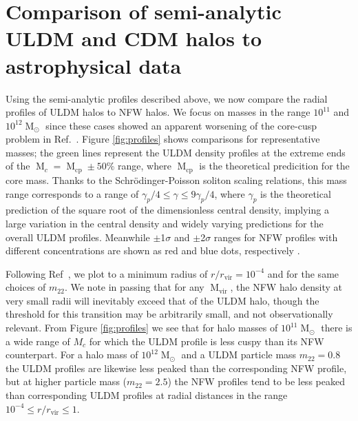 \documentclass[a4paper,11pt]{article}
\begin{document}
\section{Comparison of semi-analytic ULDM and CDM halos to astrophysical data}\label{sec:velocity}

 
Using the semi-analytic profiles described above, we now compare the radial profiles of ULDM halos to NFW halos. We focus on masses in the range $10^{11}$ and $10^{12} \operatorname{M}_{\odot}$ since these cases showed an apparent worsening of the core-cusp problem in Ref.~\cite{Robles:2018fur}. Figure \ref{fig:profiles} shows comparisons for representative masses; the green lines represent the ULDM density profiles at the extreme ends of the $\operatorname{M}_c = \operatorname{M}_{\mathrm{cp}} \pm 50 \% $ range, where $\operatorname{M}_{\mathrm{cp}}$ is the theoretical predicition for the core mass. Thanks to the  Schr{\"o}dinger-Poisson soliton scaling relations, this mass range corresponds to a range of $ \gamma_p /4 \leq \gamma \leq 9\gamma_p/4$, where $\gamma_p$ is the theoretical prediction of the square root of the dimensionless central density, implying a large variation in the central density and widely varying predictions for the overall ULDM profiles. Meanwhile $\pm$1$\sigma$ and $\pm$2$\sigma$ ranges for NFW profiles with different concentrations are shown as red and blue dots, respectively \cite{Maccio:2008pcd}. 

Following Ref~\cite{Robles:2018fur}, we plot to a minimum radius of $r/r_{\mathrm{vir}} = 10^{-4}$ and for the same choices of $m_{22}$. We note in passing that for any $\operatorname{M}_{\mathrm{vir}}$, the NFW halo density at very small radii will inevitably exceed that of the ULDM halo, though the threshold for this transition may be arbitrarily small, and not observationally relevant. From Figure \ref{fig:profiles} we see that for halo masses of $10^{11}\operatorname{M}_{\odot}$ there is a wide range of $M_c$ for which the ULDM profile is less cuspy than its NFW counterpart. For a halo mass of $10^{12}\operatorname{M}_{\odot}$ and a ULDM particle mass $m_{22}=0.8$ the ULDM profiles are likewise less peaked than the corresponding NFW profile, but at higher particle mass ($m_{22}=2.5$) the  NFW profiles tend to be less peaked than corresponding ULDM profiles at radial distances in  the range $10^{-4}\leq r/r_{\mathrm{vir}} \leq 1$.
\end{document}
